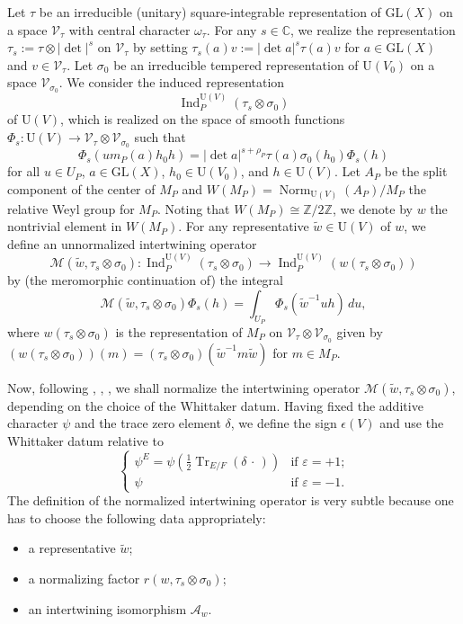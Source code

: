 \documentclass[11pt]{amsart}
\numberwithin{equation}{section}
\theoremstyle{plain}
\theoremstyle{definition}
\theoremstyle{remark}
\def\Ind{\operatorname{Ind}}
\def\Norm{\operatorname{Norm}}
\def\Tr{\operatorname{Tr}}
\def\GL{\mathrm{GL}}
\def\U{\mathrm{U}}
\def\CC{\mathbb{C}}
\def\ZZ{\mathbb{Z}}
\def\A{\mathcal{A}}
\def\M{\mathcal{M}}
\def\V{\mathscr{V}}
\begin{document}
Let $\tau$ be an irreducible (unitary) square-integrable representation of $\GL(X)$ on a space $\V_{\tau}$ with central character $\omega_{\tau}$.
For any $s \in \CC$, we realize the representation $\tau_s := \tau \otimes |\det|^s$ on $\V_{\tau}$ by setting $\tau_s(a) v := |\det a|^s \tau(a) v$ for $a \in \GL(X)$ and $v \in \V_{\tau}$.
Let $\sigma_0$ be an irreducible tempered representation of $\U(V_0)$ on a space $\V_{\sigma_0}$.
We consider the induced representation
\[
 \Ind^{\U(V)}_P(\tau_s \otimes \sigma_0)
\]
of $\U(V)$, which is realized on the space of smooth functions $\Phi_s : \U(V) \rightarrow \V_\tau \otimes \V_{\sigma_0}$ such that 
\[
 \Phi_s(u m_P(a) h_0 h) = |\det a|^{s+\rho_P} \tau(a) \sigma_0(h_0) \Phi_s(h)
\]
for all $u \in U_P$, $a \in \GL(X)$, $h_0 \in \U(V_0)$, and $h \in \U(V)$.
Let $A_P$ be the split component of the center of $M_P$ and $W(M_P) = \Norm_{\U(V)}(A_P)/M_P$ the relative Weyl group for $M_P$. Noting that $W(M_P) \cong \ZZ/2 \ZZ$, we denote by $w$ the nontrivial element in $W(M_P)$. For any representative $\tilde{w} \in \U(V)$ of $w$, we define an unnormalized intertwining operator
\[
 \M(\tilde{w}, \tau_s \otimes \sigma_0) : \Ind^{\U(V)}_P(\tau_s \otimes \sigma_0) \longrightarrow \Ind^{\U(V)}_P(w(\tau_s \otimes \sigma_0))
\]
by (the meromorphic continuation of) the integral
\[
 \M(\tilde{w}, \tau_s \otimes \sigma_0) \Phi_s(h)
 = \int_{U_P} \Phi_s(\tilde{w}^{-1} u h) \, du,
\]
where $w(\tau_s \otimes \sigma_0)$ is the representation of $M_P$ on $\V_{\tau} \otimes \V_{\sigma_0}$ given by $(w(\tau_s \otimes \sigma_0))(m) = (\tau_s \otimes \sigma_0)(\tilde{w}^{-1} m \tilde{w})$ for $m \in M_P$.

Now, following \cite{a}, \cite{mok}, \cite{kmsw}, we shall normalize the intertwining operator $\M(\tilde{w}, \tau_s \otimes \sigma_0)$, depending on the choice of the Whittaker datum.
Having fixed the additive character $\psi$ and the trace zero element $\delta$, we define the sign $\epsilon(V)$ and use the Whittaker datum relative to 
\[
 \begin{cases}
  \psi^E = \psi(\frac{1}{2} \Tr_{E/F}(\delta \, \cdot \,)) & \text{if $\varepsilon = +1$;} \\
  \psi & \text{if $\varepsilon = -1$.}
 \end{cases}
\]
The definition of the normalized intertwining operator is very subtle because one has to choose the following data appropriately:
\begin{itemize}
 \item a representative $\tilde{w}$;
 \item a normalizing factor $r(w, \tau_s \otimes \sigma_0)$;
 \item an intertwining isomorphism $\A_w$.
\end{itemize}
\end{document}
